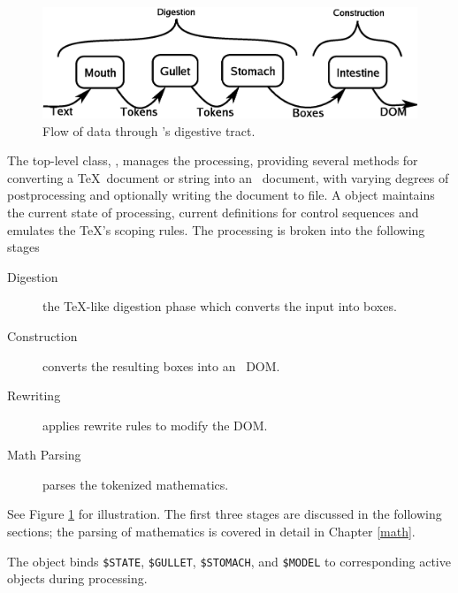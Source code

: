 \documentclass{report}
\begin{document}
\begin{figure}[tb]
\includegraphics[width=\columnwidth]{dataflow}
\caption{Flow of data through \LaTeXML's digestive tract.\label{fig:dataflow}}
\end{figure}
The top-level class, , manages the processing, providing several methods
for converting a \TeX\ document or string into an \XML\ document, with varying degrees
of postprocessing and optionally writing the document to file.
A  object maintains the current state
of processing, current definitions for control sequences and emulates the
\TeX's scoping rules.
The processing is broken into the following stages
\begin{description}
 \item[Digestion] the \TeX-like digestion phase which converts the input into boxes.
 \item[Construction] converts the resulting boxes into an \XML\ DOM.
 \item[Rewriting] applies rewrite rules to modify the DOM.
 \item[Math Parsing] parses the tokenized mathematics.
\end{description}
See Figure \ref{fig:dataflow} for illustration.
The first three stages are discussed in the following sections;
the parsing of mathematics is covered in detail in Chapter \ref{math}.

The  object binds \verb|$STATE|, \verb|$GULLET|, \verb|$STOMACH|,
and \verb|$MODEL| to corresponding active objects during processing.

\end{document}
